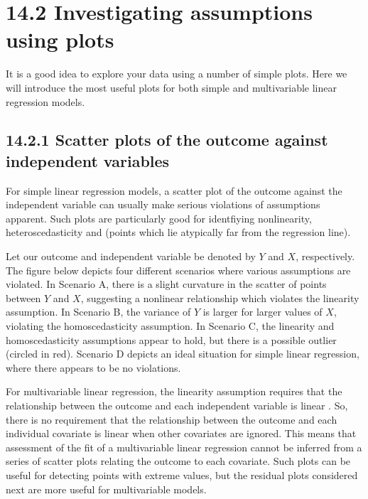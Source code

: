 \documentclass[letterpaper,10pt,english]{jupyterBook}
\let\sphinxpxdimen\pdfpxdimen\else\newdimen\sphinxpxdimen
\begin{document}
\section{14.2 Investigating assumptions using plots}
\label{\detokenize{14.c. Linear Regression III:investigating-assumptions-using-plots}}\label{\detokenize{14.c. Linear Regression III::doc}}
\sphinxAtStartPar
It is a good idea to explore your data using a number of simple plots. Here we will introduce the most useful plots for both simple and multivariable linear regression models.


\subsection{14.2.1 Scatter plots of the outcome against independent variables}
\label{\detokenize{14.c. Linear Regression III:scatter-plots-of-the-outcome-against-independent-variables}}
\sphinxAtStartPar
For simple linear regression models, a scatter plot of the outcome against the independent variable can usually make serious violations of assumptions apparent. Such plots are particularly good for identfiying non\sphinxhyphen{}linearity, heteroscedasticity and  (points which lie atypically far from the regression line).

\sphinxAtStartPar
Let our outcome and independent variable be denoted by \(Y\) and \(X\), respectively. The figure below depicts four different scenarios where various assumptions are violated. In Scenario A, there is a slight curvature in the scatter of points between \(Y\) and \(X\), suggesting a non\sphinxhyphen{}linear relationship which violates the linearity assumption. In Scenario B, the variance of \(Y\) is larger for larger values of \(X\), violating the homoscedasticity assumption. In Scenario C, the linearity and homoscedasticity assumptions appear to hold, but there is a possible outlier (circled in red). Scenario D depicts an ideal situation for simple linear regression, where there appears to be no violations.

\begin{figure}[htbp]
\centering

\noindent\sphinxincludegraphics[height=600\sphinxpxdimen]{{simple_plots}.png}
\end{figure}

\sphinxAtStartPar
For multivariable linear regression, the linearity assumption requires that the relationship between the outcome and each independent variable is linear . So, there is no requirement that the relationship between the outcome and each individual covariate is linear when other covariates are ignored. This means that assessment of the fit of a multivariable linear regression cannot be inferred from a series of scatter plots relating the outcome to each covariate. Such plots can be useful for detecting points with extreme values, but the residual plots considered next are more useful for multivariable models.
\end{document}
